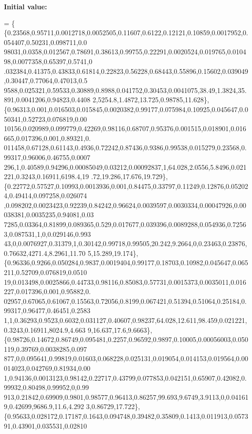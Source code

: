 {\bfseries Initial value\+:}
\begin{DoxyCode}
= \{
\{0.23568,0.95711,0.0012718,0.0052505,0.11607,0.6122,0.12121,0.10859,0.0017952,0.054407,0.50231,0.098711,0.0
      98031,0.0358,0.012567,0.78691,0.38613,0.99755,0.22291,0.0020524,0.019765,0.010498,0.0077358,0.65397,0.5741,0
      .032384,0.41375,0.43833,0.61814,0.22823,0.56228,0.68443,0.55896,0.15602,0.039049,0.30447,0.77064,0.47013,0.5
      9588,0.025321,0.59533,0.30889,0.8988,0.041752,0.30453,0.0041075,38.49,1.3824,35.891,0.0041206,0.94823,0.4408
      2,5254.8,1.4872,13.725,0.98785,11.628\},
\{0.96313,0.001,0.016503,0.015845,0.0020382,0.99177,0.075984,0.10925,0.045647,0.050341,0.52723,0.076819,0.00
      10156,0.020989,0.099779,0.42269,0.98116,0.68707,0.95376,0.001515,0.018901,0.016665,0.017396,0.001,0.89321,0.
      011458,0.67128,0.61143,0.4936,0.72242,0.87436,0.9386,0.99538,0.015279,0.23568,0.99317,0.96006,0.46755,0.0007
      296,1,0.40589,0.94296,0.00085049,0.03212,0.00092837,1,64.028,2.0556,5.8496,0.021221,0.3243,0.16911,6198.4,19
      .72,19.286,17.676,19.729\},
\{0.22772,0.57527,0.10993,0.0013936,0.001,0.84475,0.33797,0.11249,0.12876,0.052024,0.49414,0.097258,0.026074
      ,0.098202,0.0023423,0.92239,0.84242,0.96624,0.0039597,0.0030334,0.00047926,0.00038381,0.0035235,0.94081,0.03
      7285,0.03364,0.81899,0.089365,0.529,0.017677,0.039396,0.0089288,0.054936,0.72563,0.087531,1,0,0.029146,0.993
      43,0,0.0076927,0.31379,1,0.30142,0.99718,0.99505,20.242,9.2664,0,0.23463,0.23876,0.76632,4271.4,8.2961,11.70
      5,15.289,19.174\},
\{0.96336,0.9266,0.050284,0.9837,0.0019404,0.99177,0.18703,0.10982,0.045647,0.065211,0.52709,0.076819,0.0510
      19,0.013498,0.0025866,0.44733,0.98116,0.85083,0.57731,0.0015373,0.0035011,0.016227,0.017396,0.001,0.95882,0.
      02957,0.67065,0.61067,0.15563,0.72056,0.8199,0.067421,0.51394,0.51064,0.25184,0.99317,0.96477,0.46451,0.2583
      1,1,0.36293,0.9523,0.6032,0.031127,0.40607,0.98237,64.028,12.611,98.459,0.021221,0.3243,0.16911,8024.9,4.663
      9,16.637,17.6,9.6663\},
\{0.98726,0.14672,0.86749,0.095481,0.2257,0.96592,0.9897,0.10005,0.00056003,0.050119,0.39769,0.0038285,0.097
      877,0,0.095641,0.99819,0.01603,0.068228,0.025131,0.019054,0.014153,0.019564,0.00014023,0.042769,0.81934,0.00
      1,0.94136,0.0013123,0.98142,0.22717,0.43799,0.077853,0.042151,0.65907,0.42082,0.99932,0.80498,0.99952,0,0.99
      913,0.21842,0.69909,0.9801,0.98577,0.96413,0.86257,99.693,9.6749,3.9113,0,0.041619,0.42699,9686.9,11.6,4.292
      3,0.86729,17.722\},
\{0.95633,0.028172,0.17187,0.1643,0.094748,0.39482,0.35809,0.1413,0.011913,0.057391,0.43901,0.035531,0.02810

\end{DoxyCode}
